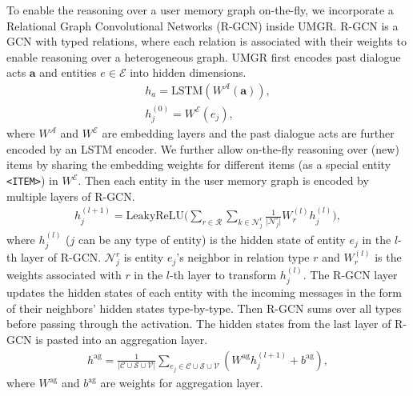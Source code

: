 To enable the reasoning over a user memory graph on-the-fly, we incorporate a Relational Graph Convolutional Networks (R-GCN) \cite{schlichtkrull2018modeling} inside UMGR.
R-GCN is a GCN \cite{kipf2016semi} with typed relations, where each relation is associated with their weights to enable reasoning over a heterogeneous graph.
UMGR first encodes past dialogue acts $\boldsymbol{a}$ and entities $e \in \mathcal{E}$ into hidden dimensions.
\begin{equation}
\begin{split}
h_a = \text{LSTM}(W^\mathcal{A}(\boldsymbol{a})), \\
h_j^{(0)} = W^\mathcal{E}(e_j),
\end{split}
\end{equation}
where $W^\mathcal{A}$ and $W^\mathcal{E}$ are embedding layers and the past dialogue acts are further encoded by an LSTM encoder.
We further allow on-the-fly reasoning over (new) items by sharing the embedding weights for different items (as a special entity \texttt{<ITEM>}) in $W^\mathcal{E}$. 
Then each entity in the user memory graph is encoded by multiple layers of R-GCN.
\begin{equation}
\begin{split}
h_j^{(l+1)}=\text{LeakyReLU} \Big(\sum_{r \in \mathcal{R}} \sum_{k \in \mathcal{N}_j^r} \frac{1}{\vert \mathcal{N}_j^r \vert} W_r^{(l)} h_j^{(l)}\Big),
\end{split}
\end{equation}
where $h_j^{(l)}$ ($j$ can be any type of entity) is the hidden state of entity $e_j$ in the $l$-th layer of R-GCN. $\mathcal{N}_j^r$ is entity $e_j$'s neighbor in relation type $r$ and $W_r^{(l)}$ is the weights associated with $r$ in the $l$-th layer to transform $h_j^{(l)}$.
The R-GCN layer updates the hidden states of each entity with the incoming messages in the form of their neighbors' hidden states type-by-type.
Then R-GCN sums over all types before passing through the activation.
The hidden states from the last layer of R-GCN is pasted into an aggregation layer.
\begin{equation}
\begin{split}
h^{\text{ag}} = \frac{1}{\vert \mathcal{C} \cup \mathcal{S} \cup \mathcal{V} \vert} \sum_{e_j \in \mathcal{C} \cup \mathcal{S} \cup \mathcal{V}} (W^\text{ag} h_j^{(l+1)} + b^{\text{ag}}),
\end{split}
\end{equation}
where $W^{\text{ag}}$ and $b^{\text{ag}}$ are weights for aggregation layer.
